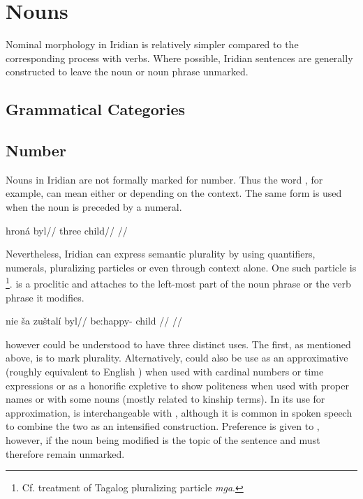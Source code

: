 \chapter{Nouns}

Nominal morphology in Iridian is relatively simpler compared to the corresponding process with verbs. Where possible, Iridian sentences are generally constructed to leave the noun or noun phrase unmarked.

\section{Grammatical Categories}

\section{Number}

Nouns in Iridian are not formally marked for number. Thus the word , for example, can mean either  or  depending on the context. The same form is used when the noun is preceded by a numeral.

\pex
\begingl
\gla hron\'a byl//
\glb three child//
\glft {}//
\endgl
\xe

Nevertheless, Iridian can express semantic plurality by using quantifiers, numerals, pluralizing particles or even through context alone. One such particle is \label{sec:plurals}\footnote{Cf.  treatment of Tagalog pluralizing particle \emph{mga}.}.  is a proclitic and attaches to the left-most part of the noun phrase or the verb phrase it modifies.

\pex
\begingl
    \gla nie \v{s}a zu\v{s}tal\'i byl//
    \glb {}  be:happy- child //
    \glft {}//
\endgl
\xe

 however could be understood to have three distinct uses. The first, as mentioned above, is to mark plurality. Alternatively,  could also be use as an approximative (roughly equivalent to English ) when used with cardinal numbers or time expressions or as a honorific expletive to show politeness when used with proper names or with some nouns (mostly related to kinship terms). In its use for approximation,  is interchangeable with , although it is common in spoken speech to combine the two as an intensified construction. Preference is given to , however, if the noun being modified is the topic of the sentence and must therefore remain unmarked.

